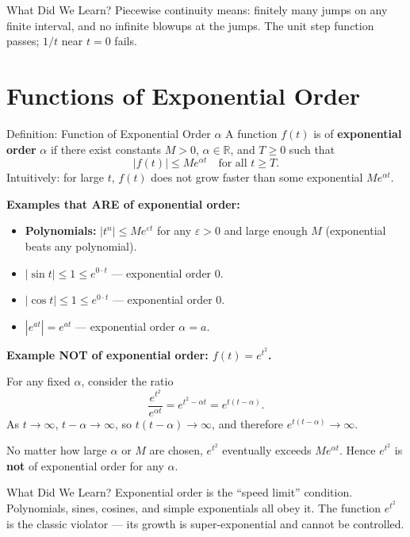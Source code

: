\documentclass[12pt,a4paper]{article}
\begin{document}
\begin{learnbox}{What Did We Learn?}
Piecewise continuity means: finitely many jumps on any finite interval, and no infinite blowups at the jumps. The unit step function passes; $1/t$ near $t=0$ fails.
\end{learnbox}

\section{Functions of Exponential Order}

\begin{infobox}{Definition: Function of Exponential Order $\alpha$}
A function $f(t)$ is of \textbf{exponential order} $\alpha$ if there exist constants $M > 0$, $\alpha \in \mathbb{R}$, and $T \geq 0$ such that
\[
  |f(t)| \leq M e^{\alpha t} \quad \text{for all } t \geq T.
\]
Intuitively: for large $t$, $f(t)$ does not grow faster than some exponential $M e^{\alpha t}$.
\end{infobox}

\textbf{Examples that ARE of exponential order:}
\begin{itemize}
  \item \textbf{Polynomials:} $|t^n| \leq M e^{\varepsilon t}$ for any $\varepsilon > 0$ and large enough $M$ (exponential beats any polynomial).
  \item $|\sin t| \leq 1 \leq e^{0 \cdot t}$ --- exponential order 0.
  \item $|\cos t| \leq 1 \leq e^{0 \cdot t}$ --- exponential order 0.
  \item $|e^{at}| = e^{at}$ --- exponential order $\alpha = a$.
\end{itemize}

\textbf{Example NOT of exponential order: $f(t) = e^{t^2}$.}

For any fixed $\alpha$, consider the ratio
\[
  \frac{e^{t^2}}{e^{\alpha t}} = e^{t^2 - \alpha t} = e^{t(t - \alpha)}.
\]
As $t \to \infty$, $t - \alpha \to \infty$, so $t(t-\alpha) \to \infty$, and therefore $e^{t(t-\alpha)} \to \infty$.

No matter how large $\alpha$ or $M$ are chosen, $e^{t^2}$ eventually exceeds $M e^{\alpha t}$. Hence $e^{t^2}$ is \textbf{not} of exponential order for any $\alpha$.

\begin{learnbox}{What Did We Learn?}
Exponential order is the ``speed limit'' condition. Polynomials, sines, cosines, and simple exponentials all obey it. The function $e^{t^2}$ is the classic violator --- its growth is super-exponential and cannot be controlled.
\end{learnbox}
\end{document}

